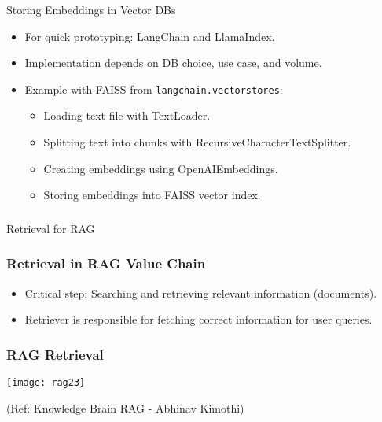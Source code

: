 \begin{frame}[fragile]{Storing Embeddings in Vector DBs}
  \begin{itemize}
    \item For quick prototyping: LangChain and LlamaIndex.
    \item Implementation depends on DB choice, use case, and volume.
    \item Example with FAISS from \texttt{langchain.vectorstores}:
      \begin{itemize}
        \item Loading text file with TextLoader.
        \item Splitting text into chunks with RecursiveCharacterTextSplitter.
        \item Creating embeddings using OpenAIEmbeddings.
        \item Storing embeddings into FAISS vector index.
      \end{itemize}
  \end{itemize}
\end{frame}

\begin{frame}[fragile]\frametitle{}
\begin{center}
{\Large Retrieval for RAG}
\end{center}
\end{frame}

\begin{frame}[fragile]\frametitle{Retrieval in RAG Value Chain}
\begin{itemize}
    \item Critical step: Searching and retrieving relevant information (documents).
    \item Retriever is responsible for fetching correct information for user queries.
\end{itemize}
\end{frame}

\begin{frame}[fragile]\frametitle{RAG Retrieval}


		\begin{center}
		\texttt{[image: rag23]}
		\end{center}

{\tiny (Ref: Knowledge Brain RAG - Abhinav  Kimothi)}

\end{frame}


